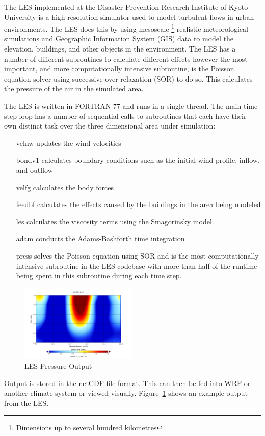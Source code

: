 The LES implemented at the Disaster Prevention Research Institute of Kyoto
University is a high-resolution simulator used to model turbulent flows in urban
environments. The LES does this by using mesoscale \footnote{Dimensions up to
several hundred kilometres} realistic meteorological simulations and Geographic
Information System (GIS) data to model the elevation, buildings, and other
objects in the environment. The LES has a number of different subroutines to
calculate different effects however the most important, and more computationally
intensive subroutine, is the Poisson equation solver using successive
over-relaxation (SOR) to do so. This calculates the pressure of the air in the
simulated area.

The LES is written in FORTRAN 77 and runs in a single thread. The main time step
loop has a number of sequential calls to subroutines that each have their own
distinct task over the three dimensional area under simulation:

\begin{itemize}[noitemsep,nolistsep]

    \item[velnw] updates the wind velocities

    \item[bondv1] calculates boundary conditions such as the initial wind
    profile, inflow, and outflow

    \item[velfg] calculates the body forces

    \item[feedbf] calculates the effects caused by the buildings in the area
    being modeled

    \item[les] calculates the viscosity terms using the Smagorinsky model.

    \item[adam] conducts the Adams-Bashforth time integration

    \item[press] solves the Poisson equation using SOR and is the most
    computationally intensive subroutine in the LES codebase with more than half
    of the runtime being spent in this subroutine during each time step.

\end{itemize}

\begin{figure}
    \includegraphics[width=0.5\textwidth]{graphs/pressure_in_LES_output_p.png}
    \caption{LES Pressure Output}
    \label{fig:lespressure}
\end{figure}

Output is stored in the netCDF file format. This can then be fed into WRF or
another climate system or viewed visually. Figure~\ref{fig:lespressure} shows an
example output from the LES.
